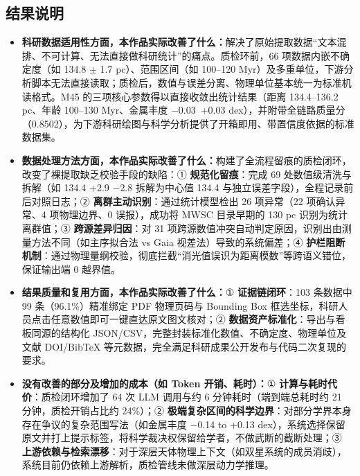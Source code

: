 \subsection{结果说明}

\begin{itemize}[leftmargin=1.2em,itemsep=2pt]
\item \textbf{科研数据适用性方面，本作品实际改善了什么：}解决了原始提取数据“文本混排、不可计算、无法直接做科研统计”的痛点。质检环前，66 项数据内嵌不确定度（如 134.8 $\pm$ 1.7 pc）、范围区间（如 100--120 Myr）及多重单位，下游分析脚本无法直接读取；质检后，数值与误差分离、物理单位基本统一为标准机读格式。M45 的三项核心参数得以直接收敛出统计结果（距离 134.4--136.2 pc、年龄 100--130 Myr、金属丰度 $-$0.03~+0.03 dex），并附带全链路质量分（0.8502），为下游科研绘图与科学分析提供了开箱即用、带置信度依据的标准数据集。
\item \textbf{数据处理方法方面，本作品实际改善了什么：}构建了全流程留痕的质检闭环，改变了裸提取缺乏校验手段的缺陷：① \textbf{规范化留痕}：完成 69 处数值级清洗与拆解（如 134.4 +2.9 $-$2.8 拆解为中心值 134.4 与独立误差字段），全程记录前后对照日志；② \textbf{离群主动识别}：通过统计模型检出 26 项异常（22 项确认异常、4 项物理边界、0 误报），成功将 MWSC 目录早期的 130 pc 识别为统计离群值；③ \textbf{跨源差异归因}：对 31 项跨源数值冲突自动判定原因，识别出由测量方法不同（如主序拟合法 vs Gaia 视差法）导致的系统偏差；④ \textbf{护栏阻断机制}：通过物理量纲校验，彻底拦截“消光值误识为距离模数”等跨语义错位，保证输出端 0 越界值。
\item \textbf{结果质量和复用方面，本作品实际改善了什么：}① \textbf{证据链闭环}：103 条数据中 99 条（96.1\%）精准绑定 PDF 物理页码与 Bounding Box 框选坐标，科研人员点击任意数值即可一键直达原文图文核对；② \textbf{数据资产标准化}：导出与看板同源的结构化 JSON/CSV，完整封装标准化数值、不确定度、物理单位及文献 DOI/BibTeX 等元数据，完全满足科研成果公开发布与代码二次复现的要求。
\item \textbf{没有改善的部分及增加的成本（如 Token 开销、耗时）：}① \textbf{计算与耗时代价}：质检闭环增加了 64 次 LLM 调用与约 6 分钟耗时（端到端总耗时约 21 分钟，质检开销占比约 24\%）；② \textbf{极端复杂区间的科学边界}：对部分学界本身存在争议的复杂范围写法（如金属丰度 $-$0.14 to +0.13 dex），系统选择保留原文并打上提示标签，将科学裁决权保留给学者，不做武断的截断处理；③ \textbf{上游依赖与检索漂移}：对于深层天体物理上下文（如双星系统的成员消歧），系统目前仍依赖上游解析，质检管线未做深层动力学推理。
\end{itemize}
